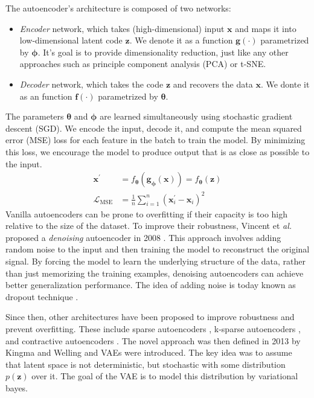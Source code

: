 The autoencoder's architecture is composed of two networks:
\begin{itemize}
    \item \textit{Encoder} network, which takes (high-dimensional) input $\boldsymbol{x}$ and maps it into low-dimensional latent code $\boldsymbol{z}$. We denote it as a
    function $\boldsymbol{g}(\cdot)$ parametrized by $\boldsymbol{\phi}$. It's goal is to provide dimensionality reduction, just like 
    any other approaches such as principle component analysis (PCA) or t-SNE. 
    \item \textit{Decoder} network, which takes the code $\boldsymbol{z}$ and recovers the data $\boldsymbol{x}$. We donte it as an function $\boldsymbol{f}(\cdot)$ parametrized by $\boldsymbol{\theta}$.
\end{itemize}
The parameters $\boldsymbol{\theta}$ and $\boldsymbol{\phi}$ are learned simultaneously using stochastic gradient descent (SGD). We encode the input, decode it, and
compute the mean squared error (MSE) loss for each feature in the batch to train the model. By minimizing this loss, we encourage the model
to produce output that is as close as possible to the input.
\begin{align*}
    {\boldsymbol{x}}^\prime &= f_{\boldsymbol{\theta}}(\boldsymbol{g}_{\boldsymbol{\phi}}(\boldsymbol{x})) = f_{\boldsymbol{\theta}}(\boldsymbol{z}) \\
    \mathcal{L}_{\text{MSE}} &= \frac{1}{n} \sum_{i=1}^{n} (\boldsymbol{x}^{\prime}_i - \boldsymbol{x}_i)^2
\end{align*}
Vanilla autoencoders can be prone to overfitting if their capacity is too high relative to the size of the dataset. To improve their
robustness, Vincent et \textit{al.} proposed a \textit{denoising} autoencoder in 2008 \cite{denoising-ae-2008}. This approach involves adding
random noise to the input and then training the model to reconstruct the original signal. By forcing the model to learn the underlying
structure of the data, rather than just memorizing the training examples, denoising autoencoders can achieve better generalization 
performance. The idea of adding noise is today known as dropout technique \cite{dropout-2014}. 

Since then, other architectures have been proposed to improve robustness and prevent overfitting. These include sparse autoencoders
\cite{sparse-ae-2011}, k-sparse autoencoders \cite{ksparse-ae-2014}, and contractive autoencoders \cite{contractive-ae-2011}. The novel 
approach was then defined in 2013 by Kingma and Welling \cite{vae-original-2013} and VAEs were introduced. The key idea was to assume that 
latent space is not deterministic, but stochastic with some distribution $p(\boldsymbol{z})$ over it. The goal of the VAE is to model this 
distribution by variational bayes. 

